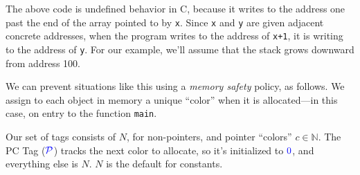 \documentclass{llncs}
\begin{document}
The above code is undefined behavior in C, because it writes to the address one past the end
of the array pointed to by {\tt x}. Since
{\tt x} and {\tt y} are given adjacent concrete addresses, when the program
writes to the address of {\tt x+1}, it is writing to the address of {\tt y}.
For our example, we'll assume that the stack grows downward from address 100.

We can prevent situations like this using a {\em memory safety} policy, as follows.
We assign to each object in memory a unique ``color'' when it is allocated---in this case,
on entry to the function {\tt main}.

Our set of tags consists of
\(N\), for non-pointers, and pointer ``colors'' \(c \in \mathbb{N}\). The PC Tag
(\(\mathcal{\color{blue} P}\)) tracks the next color to allocate, so it's initialized to \({\color{blue} 0}\), and everything else is \(N\).
\(N\) is the default for constants.

\end{document}
